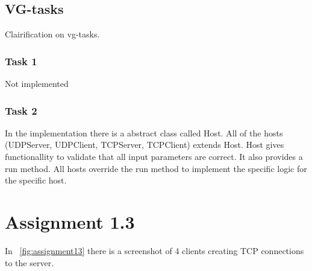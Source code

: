 \documentclass[a4paper,12pt]{article} %
\begin{document}
{\subsection{VG-tasks}

Clairification on vg-tasks.

\subsubsection{Task 1}

Not implemented

\subsubsection{Task 2}

In the implementation there is a abstract class called Host.
All of the hosts (UDPServer, UDPClient, TCPServer, TCPClient) extends Host.
Host gives functionallity to validate that all input parameters are correct.
It also provides a run method. All hosts override the run method to implement 
the specific logic for the specific host.

\clearpage

\section{Assignment 1.3}

In ~\ref{fig:assignment13} there is a screenshot of 4 clients creating TCP connections to 
the server.

}
\end{document}
